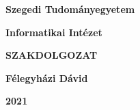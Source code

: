 \documentclass[12pt]{report}
\begin{document}
\thispagestyle{empty}

\begin{center}
{\Large\bf Szegedi Tudományegyetem}

\vspace{0.5cm}

{\Large\bf Informatikai Intézet}

\vspace*{8.5cm}


{\Huge\bf SZAKDOLGOZAT}


\vspace*{7cm}

{\LARGE\bf Félegyházi Dávid}

\vspace*{0.6cm}

{\Large\bf 2021}

\end{center}
\end{document}
